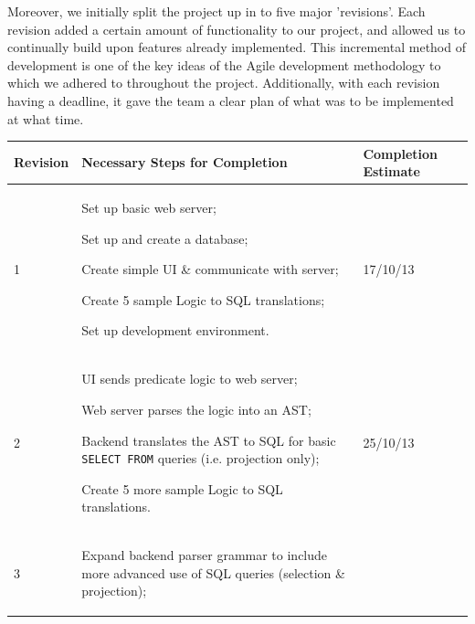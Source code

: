 \documentclass[a4paper, 11pt]{article}
\begin{document}
    Moreover, we initially split the project up in to five major 'revisions'.
    Each revision added a certain amount of functionality to our project, and
    allowed us to continually build upon features already implemented. This
    incremental method of development is one of the key ideas of the Agile
    development methodology to which we adhered to throughout the project.
    \cite{agilemanifesto} Additionally, with each revision having a
    deadline, it gave the team a clear plan of what was to be implemented at
    what time.

    \begin{table}[H]
      \centering
      \begin{tabular}{| l | p{} | l |}
        \hline
        \textbf{Revision} & \textbf{Necessary Steps for Completion}
          & \textbf{Completion Estimate} \\
        \hline
        1 &
          \begin{compactitem}
            \item Set up basic web server;
            \item Set up and create a database;
            \item Create simple UI \& communicate with server;
            \item Create 5 sample Logic to SQL translations;
            \item Set up development environment.
          \end{compactitem}
          & 17/10/13 \\
        \hline
        2 &
          \begin{compactitem}
            \item UI sends predicate logic to web server;
            \item Web server parses the logic into an AST;
            \item Backend translates the AST to SQL for basic \texttt{SELECT
              FROM} queries (i.e. projection only);
            \item Create 5 more sample Logic to SQL translations.
          \end{compactitem}
          & 25/10/13 \\
        \hline
        3 &
          \begin{compactitem}
            \item Expand backend parser grammar to include more advanced use of
              SQL queries (selection \& projection);

\end{compactitem}
\end{tabular}
\end{table}
\end{document}
